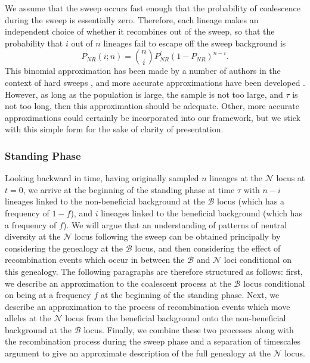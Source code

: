 \documentclass[a4paper,10pt]{article}
\newcommand{\fancyN}{$\mathcal N$ }
\newcommand{\fancyB}{$\mathcal B$ }
\begin{document}
We assume that the sweep occurs fast enough that the probability of coalescence during the sweep is essentially zero. Therefore, each lineage makes an independent choice of whether it recombines out of the sweep, so that the probability that $i$ out of $n$ lineages fail to escape off the sweep background is
\begin{equation}
P_{NR}(i;n) = {n \choose i} P_{NR}^{i} (1-P_{NR})^{n-i}.
\end{equation}
This binomial approximation has been made by a number of authors in the context of hard sweeps \citep{Barton}, and more accurate approximations have been developed \citep{Etheridge2006}. However, as long as the population is large, the sample is not too large,  and $\tau$ is not too long, then this approximation should be adequate. Other, more accurate approximations could certainly be incorporated into our framework, but we stick with this simple form for the sake of clarity of presentation.




\subsubsection{Standing Phase}
Looking backward in time, having originally sampled $n$ lineages at the \fancyN locus at $t=0$, we arrive at the beginning of the standing phase at time $\tau$ with $n-i$ lineages linked to the non-beneficial background at the \fancyB locus (which has a frequency of $1-f$), and $i$ lineages linked to the beneficial background (which has a frequency of $f$). We will argue that an understanding of patterns of neutral diversity at the \fancyN locus following the sweep can be obtained principally by considering the genealogy at the \fancyB locus, and then considering the effect of recombination events which occur in between the \fancyB and \fancyN loci conditional on this genealogy. The following paragraphs are therefore structured as follows: first, we describe an approximation to the coalescent process at the \fancyB locus conditional on being at a frequency $f$ at the beginning of the standing phase. Next, we describe an approximation to the process of recombination events which move alleles at the \fancyN locus from the beneficial background onto the non-beneficial background at the \fancyB locus. Finally, we combine these two processes along with the recombination process during the sweep phase and a separation of timescales argument to give an approximate description of the full genealogy at the \fancyN locus.
\end{document}
